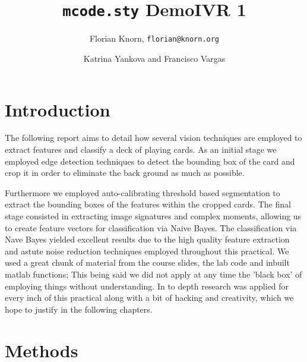 \documentclass[11pt]{article}
\title{\texttt{mcode.sty} Demo}
\author{Florian Knorn, \texttt{florian@knorn.org}}
\theoremstyle{plain}
\theoremstyle{definition}
\begin{document}
 
\title{IVR 1}
\author{Katrina Yankova 
and 
Francisco Vargas}
\maketitle

\section{Introduction}
The following report aims to detail how several vision techniques are employed to extract features and classify a deck of playing cards. 
\newline
\newline
As an initial stage we 
employed edge detection techniques to detect the
bounding box of the card and crop it in order to
eliminate the back ground as much as possible.

Furthermore we employed auto-calibrating threshold based segmentation to extract the bounding boxes of the features within the cropped cards. The final stage consisted in extracting image signatures and complex moments, allowing us to create feature vectors for classification via Naive Bayes. The classification via Nave Bayes yielded excellent results due to the high quality feature extraction and astute noise reduction techniques employed throughout this practical. 
\newline
\newline
We used a great chunk of material from the course slides, the lab code and inbuilt matlab functions; This being said we did not apply at any time the 'black box' of employing things without understanding. In to depth research was applied for every inch of this practical along with a bit of hacking and creativity, which we hope to justify in the following chapters. 

\section{Methods}
\end{document}
